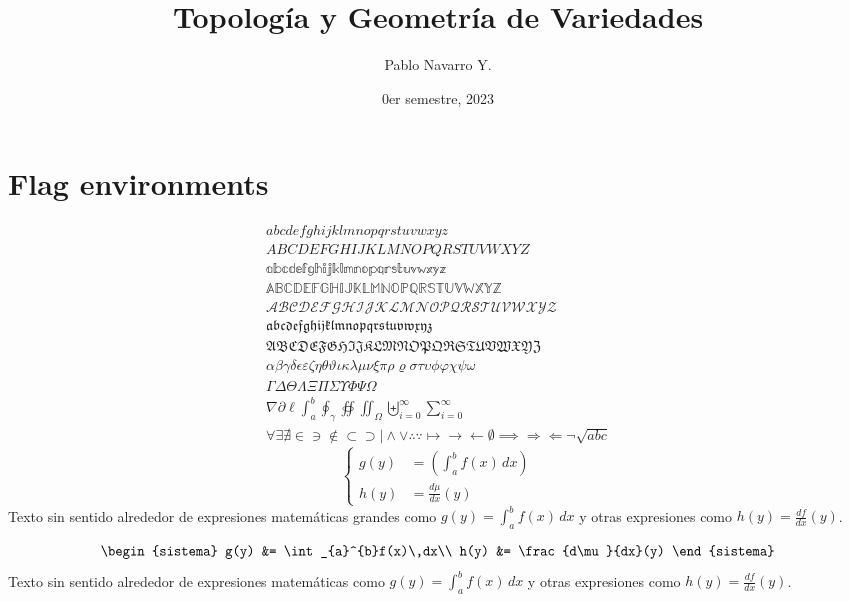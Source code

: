 \documentclass[toc,todo,libertinus]{apuntes}
\title{Topología y Geometría de Variedades}
\author{Pablo Navarro Y.}
\date{0er semestre, 2023}
\begin{document}
\renewcommand{\onlyinsubfile}[1]{}
\renewcommand{\notinsubfile}[1]{#1}
\maketitle

\section{Flag environments}
\begin{align}
  a b c d e f g h i j k l m n o p q r s t u v w x y z \\
  A B C D E F G H I J K L M N O P Q R S T U V W X Y Z \\
  \mathbb{a b c d e f g h i j k l m n o p q r s t u v w x y z} \\
  \mathbb{A B C D E F G H I J K L M N O P Q R S T U V W X Y Z} \\
  \mathcal{A B C D E F G H I J K L M N O P Q R S T U V W X Y Z} \\
  \mathfrak{a b c d e f g h i j k l m n o p q r s t u v w x y z} \\
  \mathfrak{A B C D E F G H I J K L M N O P Q R S T U V W X Y Z} \\
  \alpha \beta \gamma \delta \epsilon \varepsilon \zeta \eta \theta \vartheta \iota \kappa \lambda \mu \nu \xi \pi \rho \varrho \sigma \tau \upsilon \phi \varphi \chi \psi \omega \\
  \Gamma \Delta \Theta \Lambda \Xi \Pi \Sigma \Upsilon \Phi \Psi \Omega \\
  \nabla \partial \ell \int_{a}^{b} \oint_{\gamma} \oiint  \iint_{\Omega} \biguplus_{i=0}^{\infty} \sum_{i=0}^{\infty}\\
  \forall \exists \nexists \in \ni \notin \subset \supset \mid \wedge \vee \therefore \because \mapsto \to \gets \emptyset \implies \Rightarrow \Leftarrow \neg
  \sqrt{abc}
\end{align}
\begin{equation}
  \left\lbrace
	\begin{aligned}
	  g(y) &= \left( \int_{a}^{b}f(x)\,dx \right)\\
	  h(y) &= \frac{d\mu}{dx}(y)
	\end{aligned}
  \right.
\end{equation}
Texto sin sentido alrededor de expresiones matemáticas grandes como \(g(y) = \int_{a}^{b}f(x)\,dx\) y otras expresiones como \(h(y) = \frac{df}{dx}(y)\).

\begin{definicion}[][reff]
	\begin{equation}
		\begin{sistema}
			g(y) &= \int_{a}^{b}f(x)\,dx\\
			h(y) &= \frac{d\mu}{dx}(y)
		\end{sistema}
	\end{equation}
	Texto sin sentido alrededor de expresiones matemáticas como \(g(y) = \int_{a}^{b}f(x)\,dx\) y otras expresiones como \(h(y) = \frac{df}{dx}(y)\).
	\lipsum[1]
\end{definicion}
\end{document}
